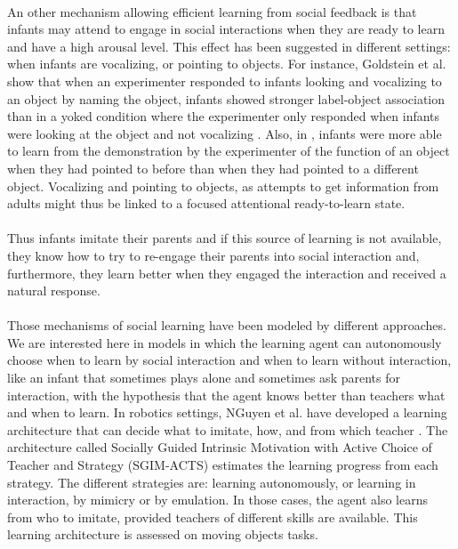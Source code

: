 \documentclass[12pt]{article}
\begin{document}
		\paragraph{}
		An other mechanism allowing efficient learning from social feedback is that infants may attend to engage in social interactions 
		when they are ready to learn and have a high arousal level. 
		This effect has been suggested in different settings: when infants are vocalizing, or pointing to objects. 
		For instance, Goldstein et al. show that when an experimenter responded to infants 
		looking and vocalizing to an object by naming the object, infants showed stronger label-object association than in a yoked condition where the
		experimenter only responded when infants were looking at the object and not vocalizing \cite{goldstein2010learning}. 
		Also, in \cite{begus}, infants were more able to learn from the demonstration by the experimenter 
		of the function of an object when they had pointed to before than 
		when they had pointed to a different object. Vocalizing and pointing to objects, as attempts to get information from adults 
		might thus be linked to a focused attentional ready-to-learn state.		
		
		\paragraph{}
		Thus infants imitate their parents and if this source of learning is not available, 
		they know how to try to re-engage their parents into social interaction
		and, furthermore, they learn better when they engaged the interaction and received a natural response.	

		\paragraph{}
		Those mechanisms of social learning have been modeled by different approaches.
		We are interested here in models in which the learning agent can autonomously choose when to learn by social interaction and when to learn without
		interaction, like an infant that sometimes plays alone and sometimes ask parents for interaction, with the hypothesis that the agent knows
		better than teachers what and when to learn.
		In robotics settings, NGuyen et al. have developed a learning architecture that can decide what to imitate, 
		how, and from which teacher \cite{nguyen2012}.
		The architecture called Socially Guided Intrinsic Motivation with Active Choice of Teacher and Strategy (SGIM-ACTS) estimates the learning 
		progress from each strategy. The different strategies are: learning autonomously, or learning in interaction, by mimicry or by emulation.
		In those cases, the agent also learns from who to imitate, provided teachers of different skills are 
		available. This learning architecture is assessed on moving objects tasks.		
		
\end{document}

